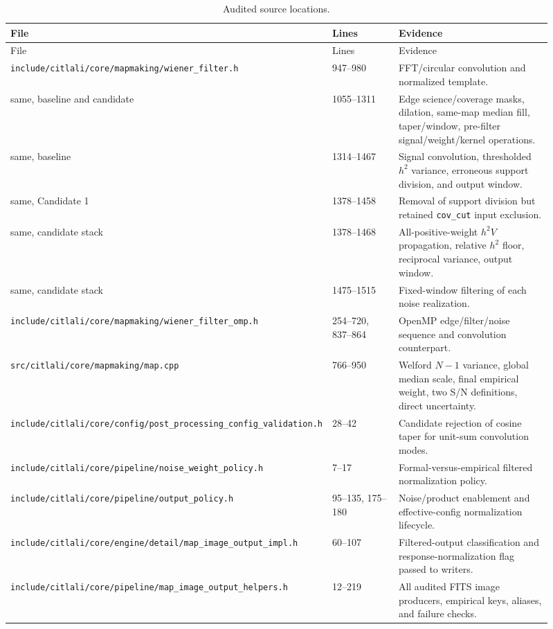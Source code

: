 \documentclass[11pt]{article}
\newcommand{\code}[1]{\nolinkurl{#1}}
\begin{document}
\begin{longtable}{L{0.37\linewidth}L{0.17\linewidth}L{0.37\linewidth}}
\caption{Audited source locations.}\label{tab:sources}\\
\toprule
File & Lines & Evidence\\
\midrule
\endfirsthead
\toprule
File & Lines & Evidence\\
\midrule
\endhead
\code{include/citlali/core/mapmaking/wiener_filter.h} & 947--980 & FFT/circular convolution and normalized template.\\
same, baseline and candidate & 1055--1311 & Edge science/coverage masks, dilation, same-map median fill, taper/window, pre-filter signal/weight/kernel operations.\\
same, baseline & 1314--1467 & Signal convolution, thresholded $h^2$ variance, erroneous support division, and output window.\\
same, Candidate 1 & 1378--1458 & Removal of support division but retained \code{cov_cut} input exclusion.\\
same, candidate stack & 1378--1468 & All-positive-weight $h^2V$ propagation, relative $h^2$ floor, reciprocal variance, output window.\\
same, candidate stack & 1475--1515 & Fixed-window filtering of each noise realization.\\
\code{include/citlali/core/mapmaking/wiener_filter_omp.h} & 254--720, 837--864 & OpenMP edge/filter/noise sequence and convolution counterpart.\\
\code{src/citlali/core/mapmaking/map.cpp} & 766--950 & Welford $N-1$ variance, global median scale, final empirical weight, two S/N definitions, direct uncertainty.\\
\code{include/citlali/core/config/post_processing_config_validation.h} & 28--42 & Candidate rejection of cosine taper for unit-sum convolution modes.\\
\code{include/citlali/core/pipeline/noise_weight_policy.h} & 7--17 & Formal-versus-empirical filtered normalization policy.\\
\code{include/citlali/core/pipeline/output_policy.h} & 95--135, 175--180 & Noise/product enablement and effective-config normalization lifecycle.\\
\code{include/citlali/core/engine/detail/map_image_output_impl.h} & 60--107 & Filtered-output classification and response-normalization flag passed to writers.\\
\code{include/citlali/core/pipeline/map_image_output_helpers.h} & 12--219 & All audited FITS image producers, empirical keys, aliases, and failure checks.\\

\end{longtable}
\end{document}
